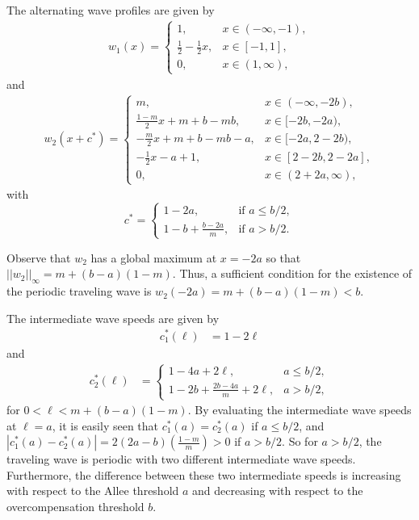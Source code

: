 \documentclass[11pt]{article}
\theoremstyle{definition}
\numberwithin{equation}{section}
\numberwithin{thm}{section}
\renewcommand{\a}{a}
\renewcommand{\b}{b}
\newcommand{\m}{m}
\begin{document}
The alternating wave profiles are given by
\begin{equation}  \label{uniformw1}
\begin{aligned}
w_1(x) 
= \begin{cases}
1, & x \in (-\infty, -1), \\
\frac{1}{2}-\frac{1}{2}x, & x \in [-1, 1] ,\\
0, & x \in (1, \infty),
\end{cases}
\end{aligned} \end{equation}
and 
\begin{equation} \label{uniformw2}
\begin{aligned}
w_2(x+c^*)
= \begin{cases}
m,
& x \in (-\infty, -2\b), \\
\frac{1-m}{2}x + m + b - mb,
& x \in [-2\b, 
 -2\a), \\
-\frac{m}{2}x +m+b- mb-a,
& x \in [-2\a, 2-2\b), \\
-\frac{1}{2} x-a+1,
& x \in [2-2\b, 2-2\a], \\
0,
& x \in (2+2\a,\infty),
\end{cases}
\end{aligned} \end{equation}
with
\begin{equation} \label{clinear}
c^* = \begin{cases}
1 - 2a, & \text{if } a \leq b/2, \\
1 -b + \frac{b - 2a}{m}, & \text{if }a > b/2.
\end{cases}
\end{equation}

Observe that $w_2$ has a global maximum at $x=-2\a$ so that $||w_2||_\infty=m+(b-a)(1-m)$. Thus, a sufficient condition for the existence of the periodic traveling wave is $w_2(-2\a)=m+(b-a)(1-m) < \b$. 

The intermediate wave speeds are given by
\begin{equation} \begin{aligned}
c_1^*(\ell) 
&= 1-2\ell
\end{aligned}
\end{equation}
and
\begin{equation} \begin{aligned}
c_2^*(\ell) 
&= \begin{cases}
1 - 4a + 2\ell, & a \leq b/2, \\
1 - 2b + \frac{2b-4a}{m} + 2\ell, & a > b/2 ,
\end{cases}
\end{aligned} \end{equation}
for $0 < \ell < m + (b-a)(1-m)$. By evaluating the intermediate wave speeds at $\ell=\a$, it is easily seen that $c_1^*(\a)=c_2^*(\a)$ if $\a \leq \b/2$, and $|c_1^*(\a)-c_2^*(\a)|=2(2\a-\b)(\frac{1-\m}{\m})>0$ if $a>b/2$. So for $a>b/2$, the traveling wave is periodic with two different intermediate wave speeds. Furthermore, the difference between these two intermediate speeds is increasing with respect to the Allee threshold $\a$ and decreasing with respect to the overcompensation threshold $\b$.
\end{document}
